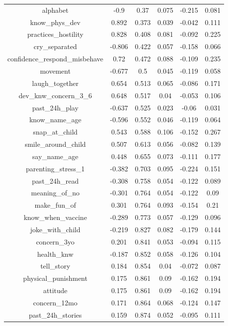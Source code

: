 \begin{table}[!htbp]
\begin{tabular}{@{\extracolsep{5pt}} cccccc}
alphabet & -0.9 & 0.37 & 0.075 & -0.215 & 0.081 \\ 
know\_phys\_dev & 0.892 & 0.373 & 0.039 & -0.042 & 0.111 \\ 
practices\_hostility & 0.828 & 0.408 & 0.081 & -0.092 & 0.225 \\ 
cry\_separated & -0.806 & 0.422 & 0.057 & -0.158 & 0.066 \\ 
confidence\_respond\_misbehave & 0.72 & 0.472 & 0.088 & -0.109 & 0.235 \\ 
movement & -0.677 & 0.5 & 0.045 & -0.119 & 0.058 \\ 
laugh\_together & 0.654 & 0.513 & 0.065 & -0.086 & 0.171 \\ 
dev\_knw\_concern\_3\_6 & 0.648 & 0.517 & 0.04 & -0.053 & 0.106 \\ 
past\_24h\_play & -0.637 & 0.525 & 0.023 & -0.06 & 0.031 \\ 
know\_name\_age & -0.596 & 0.552 & 0.046 & -0.119 & 0.064 \\ 
snap\_at\_child & 0.543 & 0.588 & 0.106 & -0.152 & 0.267 \\ 
smile\_around\_child & 0.507 & 0.613 & 0.056 & -0.082 & 0.139 \\ 
say\_name\_age & 0.448 & 0.655 & 0.073 & -0.111 & 0.177 \\ 
parenting\_stress\_1 & -0.382 & 0.703 & 0.095 & -0.224 & 0.151 \\ 
past\_24h\_read & -0.308 & 0.758 & 0.054 & -0.122 & 0.089 \\ 
meaning\_of\_no & -0.301 & 0.764 & 0.054 & -0.122 & 0.09 \\ 
make\_fun\_of & 0.301 & 0.764 & 0.093 & -0.154 & 0.21 \\ 
know\_when\_vaccine & -0.289 & 0.773 & 0.057 & -0.129 & 0.096 \\ 
joke\_with\_child & -0.219 & 0.827 & 0.082 & -0.179 & 0.144 \\ 
concern\_3yo & 0.201 & 0.841 & 0.053 & -0.094 & 0.115 \\ 
health\_knw & -0.187 & 0.852 & 0.058 & -0.126 & 0.104 \\ 
tell\_story & 0.184 & 0.854 & 0.04 & -0.072 & 0.087 \\ 
physical\_punishment & 0.175 & 0.861 & 0.09 & -0.162 & 0.194 \\ 
attitude & 0.175 & 0.861 & 0.09 & -0.162 & 0.194 \\ 
concern\_12mo & 0.171 & 0.864 & 0.068 & -0.124 & 0.147 \\ 
past\_24h\_stories & 0.159 & 0.874 & 0.052 & -0.095 & 0.111 \\ 

\end{tabular}
\end{table}
